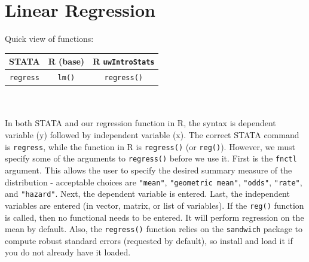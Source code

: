\documentclass[11pt,letterpaper,fleqn]{report}
\begin{document}
\chapter{Linear Regression}
Quick view of functions:\\
\begin{tabular}{ccc}
STATA & R (base) & R \texttt{uwIntroStats}\\
\hline
\texttt{regress} & \texttt{lm()} & \texttt{regress()}\\
\end{tabular}\\
\\
In both STATA and our regression function in R, the syntax is dependent variable (y) followed by independent variable (x). The correct STATA command is \texttt{regress}, while the function in R is \texttt{regress()} (or \texttt{reg()}). However, we must specify some of the arguments to \texttt{regress()} before we use it. First is the \texttt{fnctl} argument. This allows the user to specify the desired summary measure of the distribution - acceptable choices are \texttt{"mean"}, \texttt{"geometric mean"}, \texttt{"odds"}, \texttt{"rate"}, and \texttt{"hazard"}. Next, the dependent variable is entered. Last, the independent variables are entered (in vector, matrix, or list of variables). If the \texttt{reg()} function is called, then no functional needs to be entered. It will perform regression on the mean by default.
\newline Also, the \texttt{regress()} function relies on the \texttt{sandwich} package to compute robust standard errors (requested by default), so install and load it if you do not already have it loaded.
\end{document}
